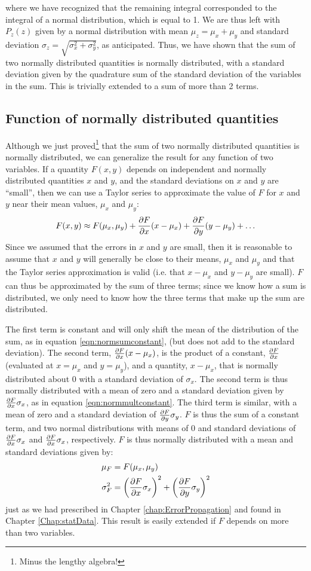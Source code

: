 where we have recognized that the remaining integral corresponded to the integral of a normal distribution, which is equal to 1. We are thus left with $P_z(z)$ given by a normal distribution with mean $\mu_z=\mu_x+\mu_y$ and standard deviation $\sigma_z=\sqrt{\sigma_x^2+\sigma_y^2}$, as anticipated. Thus, we have shown that the sum of two normally distributed quantities is normally distributed, with a standard deviation given by the quadrature sum of the standard deviation of the variables in the sum. This is trivially extended to a sum of more than 2 terms.
\subsection{Function of normally distributed quantities}
Although we just proved\footnote{Minus the lengthy algebra!} that the sum of two normally distributed quantities is normally distributed, we can generalize the result for any function of two variables. If a quantity $F(x,y)$ depends on independent and normally distributed quantities $x$ and $y$, and the standard deviations on $x$ and $y$ are ``small'', then we can use a Taylor series to approximate the value of $F$ for $x$ and $y$ near their mean values, $\mu_x$ and $\mu_y$:
\begin{align*}
F(x,y) \approx F(\mu_x,\mu_y)+\frac{\partial F}{\partial x}(x-\mu_x)+\frac{\partial F}{\partial y}(y-\mu_y)+\dots
\end{align*}
Since we assumed that the errors in $x$ and $y$ are small, then it is reasonable to assume that $x$ and $y$ will generally be close to their means, $\mu_x$ and $\mu_y$ and that the Taylor series approximation is valid (i.e. that $x-\mu_x$ and $y-\mu_y$ are small). $F$ can thus be approximated by the sum of three terms; since we know how a sum is distributed, we only need to know how the three terms that make up the sum are distributed.

The first term is constant and will only shift the mean of the distribution of the sum, as in equation \ref{eqn:normsumconstant}, (but does not add to the standard deviation). The second term, $\frac{\partial F}{\partial x}(x-\mu_x)$, is the product of a constant, $\frac{\partial F}{\partial x}$ (evaluated at $x=\mu_x$ and $y=\mu_y$), and a quantity, $x-\mu_x$, that is normally distributed about 0 with a standard deviation of $\sigma_x$. The second term is thus normally distributed with a mean of zero and a standard deviation given by $\frac{\partial F}{\partial x}\sigma_x$, as in equation \ref{eqn:normmultconstant}. The third term is similar, with a mean of zero and a standard deviation of $\frac{\partial F}{\partial y}\sigma_y$. $F$ is thus the sum of a constant term, and two normal distributions with means of 0 and standard deviations of $\frac{\partial F}{\partial x}\sigma_x$ and $\frac{\partial F}{\partial x}\sigma_x$, respectively. $F$ is thus normally distributed with a mean and standard deviations given by:
\begin{align}
\label{eqn:normerror}
\mu_F &=F(\mu_x,\mu_y)\nonumber\\
\sigma_F^2&=\left(\frac{\partial F}{\partial x}\sigma_x\right)^2+\left(\frac{\partial F}{\partial y}\sigma_y\right)^2
\end{align}
just as we had prescribed in Chapter \ref{chap:ErrorPropagation} and found in Chapter \ref{Chap:statData}. This result is easily extended if $F$ depends on more than two variables.

